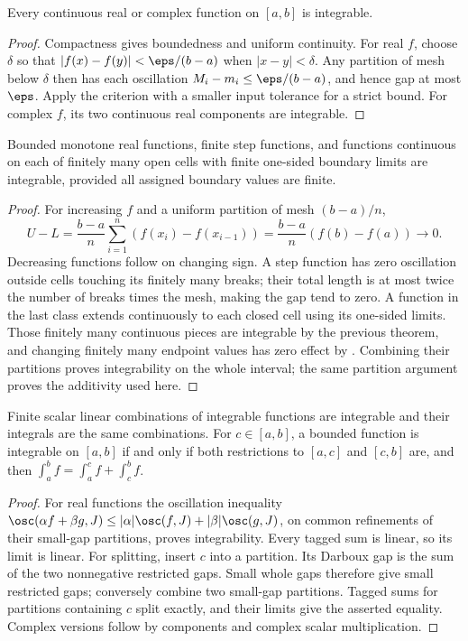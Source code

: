 \begin{theorem}
Every continuous real or complex function on $[a,b]$ is integrable.
\end{theorem}
\begin{proof}
Compactness gives boundedness and uniform continuity. For real $f$, choose
$\delta$ so that $|f(x)-f(y)|<\eps/(b-a)$ when $|x-y|<\delta$.
Any partition of mesh below $\delta$ then has each oscillation
$M_i-m_i\le\eps/(b-a)$, and hence gap at most $\eps$.
Apply the criterion with a smaller input tolerance for a strict bound.
For complex $f$, its two continuous real components are integrable.
\end{proof}

\begin{theorem}
Bounded monotone real functions, finite step functions, and functions
continuous on each of finitely many open cells with finite one-sided
boundary limits are integrable, provided all assigned boundary values are finite.
\end{theorem}
\begin{proof}
For increasing $f$ and a uniform partition of mesh $(b-a)/n$,
\[U-L=\frac{b-a}{n}\sum_{i=1}^n(f(x_i)-f(x_{i-1}))
=\frac{b-a}{n}(f(b)-f(a))\longrightarrow0.
\]
Decreasing functions follow on changing sign. A step function has zero
oscillation outside cells touching its finitely many breaks; their total
length is at most twice the number of breaks times the mesh, making the
gap tend to zero. A function in the last class extends continuously to
each closed cell using its one-sided limits. Those finitely many continuous
pieces are integrable by the previous theorem, and changing finitely many
endpoint values has zero effect by .
Combining their partitions proves integrability on the whole interval;
the same partition argument proves the additivity used here.
\end{proof}

\begin{theorem}
Finite scalar linear combinations of integrable functions are integrable
and their integrals are the same combinations. For $c\in[a,b]$, a bounded
function is integrable on $[a,b]$ if and only if both restrictions to
$[a,c]$ and $[c,b]$ are, and then
$\int_a^bf=\int_a^cf+\int_c^bf$.
\end{theorem}
\begin{proof}
For real functions the oscillation inequality
$\osc(\alpha f+\beta g,J)\le|\alpha|\osc(f,J)+|\beta|\osc(g,J)$,
on common refinements of their small-gap partitions, proves integrability.
Every tagged sum is linear, so its limit is linear. For splitting, insert
$c$ into a partition. Its Darboux gap is the sum of the two nonnegative
restricted gaps. Small whole gaps therefore give small restricted gaps;
conversely combine two small-gap partitions. Tagged sums for partitions
containing $c$ split exactly, and their limits give the asserted equality.
Complex versions follow by components and complex scalar multiplication.
\end{proof}

